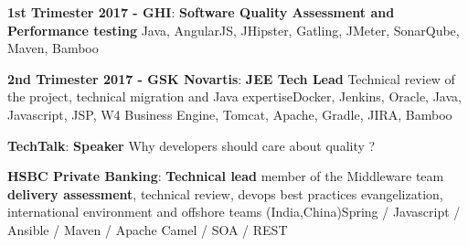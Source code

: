 \begin{cventries}
{\begin{cvitems}
            \item { \textbf{1st Trimester 2017 - GHI}: \textbf{Software Quality Assessment and Performance testing} \newline Java, AngularJS, JHipster, Gatling, JMeter, SonarQube, Maven, Bamboo}
            \item { \textbf{2nd Trimester 2017 - GSK Novartis}: \textbf{JEE Tech Lead} \newline Technical review of the project, technical migration and Java expertise\newline Docker, Jenkins, Oracle, Java, Javascript, JSP, W4 Business Engine, Tomcat, Apache, Gradle, JIRA, Bamboo}
            \item { \textbf{TechTalk}: \textbf{Speaker} \newline Why developers should care about quality ?}
            \item { \textbf{HSBC Private Banking}: \textbf{Technical lead} \newline member of the Middleware team  \textbf{delivery assessment}, technical review, devops best practices evangelization, international environment and offshore teams (India,China)\newline Spring / Javascript / Ansible / Maven / Apache Camel / SOA / REST}
        \end{cvitems}
    }


\end{cventries}
